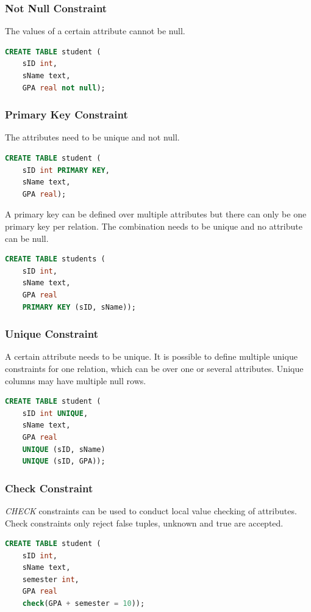\subsubsection{Not Null Constraint}
The values of a certain attribute cannot be null.
\begin{lstlisting}[language=SQL]
CREATE TABLE student (
	sID int,
	sName text,
	GPA real not null);
\end{lstlisting}

\subsubsection{Primary Key Constraint}
The attributes need to be unique and not null.
\begin{lstlisting}[language=SQL]
CREATE TABLE student (
	sID int PRIMARY KEY,
	sName text,
	GPA real);
\end{lstlisting}
A primary key can be defined over multiple attributes but there can only be one primary key per relation. The combination needs to be unique and no attribute can be null.
\begin{lstlisting}[language=SQL]
CREATE TABLE students (
	sID int,
	sName text,
	GPA real
	PRIMARY KEY (sID, sName));
\end{lstlisting}

\subsubsection{Unique Constraint}
A certain attribute needs to be unique. It is possible to define multiple unique constraints for one relation, which can be over one or several attributes. Unique columns may have multiple null rows.
\begin{lstlisting}[language=SQL]
CREATE TABLE student (
	sID int UNIQUE,
	sName text,
	GPA real
	UNIQUE (sID, sName)
	UNIQUE (sID, GPA));
\end{lstlisting}

\subsubsection{Check Constraint}
\textit{CHECK} constraints can be used to conduct local value checking of attributes. Check constraints only reject false tuples, unknown and true are accepted.
\begin{lstlisting}[language=SQL]
CREATE TABLE student (
	sID int,
	sName text,
	semester int,
	GPA real
	check(GPA + semester = 10));
\end{lstlisting}

